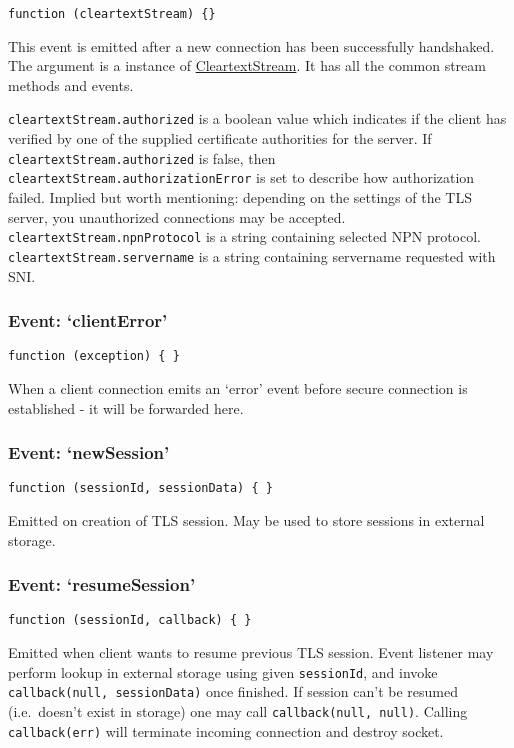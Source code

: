 \texttt{function (cleartextStream) \{\}}

This event is emitted after a new connection has been successfully
handshaked. The argument is a instance of
\hyperref[tls_class_tls_cleartextstream]{CleartextStream}. It has all
the common stream methods and events.

\texttt{cleartextStream.authorized} is a boolean value which indicates
if the client has verified by one of the supplied certificate
authorities for the server. If \texttt{cleartextStream.authorized} is
false, then \texttt{cleartextStream.authorizationError} is set to
describe how authorization failed. Implied but worth mentioning:
depending on the settings of the TLS server, you unauthorized
connections may be accepted. \texttt{cleartextStream.npnProtocol} is a
string containing selected NPN protocol.
\texttt{cleartextStream.servername} is a string containing servername
requested with SNI.

\subsubsection{Event: `clientError'}

\texttt{function (exception) \{ \}}

When a client connection emits an `error' event before secure connection
is established - it will be forwarded here.

\subsubsection{Event: `newSession'}

\texttt{function (sessionId, sessionData) \{ \}}

Emitted on creation of TLS session. May be used to store sessions in
external storage.

\subsubsection{Event: `resumeSession'}

\texttt{function (sessionId, callback) \{ \}}

Emitted when client wants to resume previous TLS session. Event listener
may perform lookup in external storage using given \texttt{sessionId},
and invoke \texttt{callback(null, sessionData)} once finished. If
session can't be resumed (i.e.~doesn't exist in storage) one may call
\texttt{callback(null, null)}. Calling \texttt{callback(err)} will
terminate incoming connection and destroy socket.

